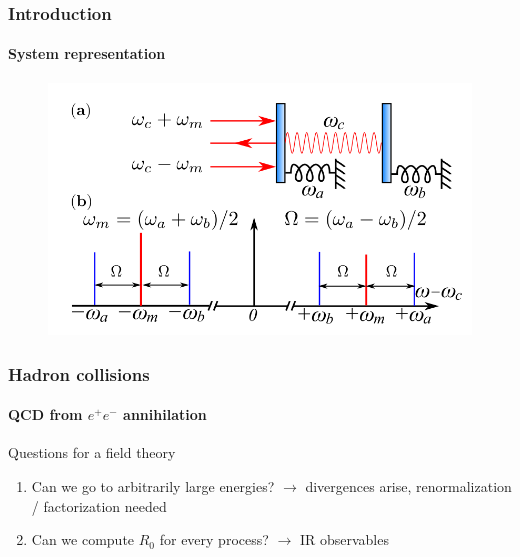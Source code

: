 \documentclass[aspectratio=43]{beamer}
\begin{document}
\begin{frame}

	\frametitle{Introduction}
	\framesubtitle{System representation}
	
	\begin{figure}
		\includegraphics[width = 8 cm]{plots/system.png}
	\end{figure}	

\end{frame}

\begin{frame}
	
	\frametitle{Hadron collisions}
	\framesubtitle{QCD from $e^{+}e^{-}$ annihilation}
	
	Questions for a field theory
	\begin{enumerate}
		\item Can we go to arbitrarily large energies? $\rightarrow$ divergences arise, renormalization / factorization needed
		\item Can we compute $R_{0}$ for every process? $\rightarrow$ IR observables
	\end{enumerate}	

\end{frame}
\end{document}
